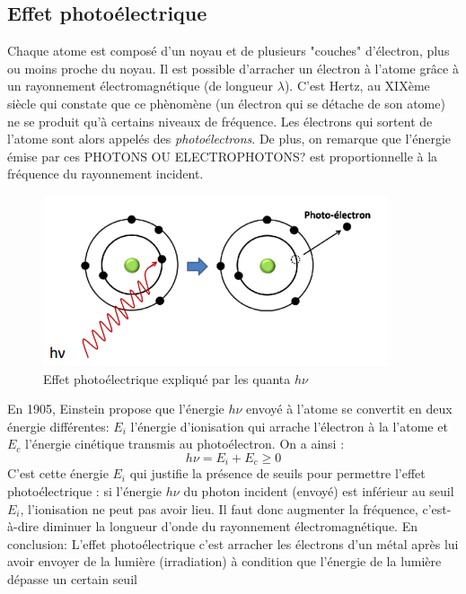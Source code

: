 \documentclass{article}
\begin{document}
\subsection{Effet photoélectrique}
\indent Chaque atome est composé d'un noyau et de plusieurs "couches" d'électron, plus ou moins proche du noyau. Il est possible d'arracher un électron à l'atome grâce à un rayonnement électromagnétique (de longueur $\lambda$).\newline
\indent C'est Hertz, au XIXème siècle qui constate que ce phènomène (un électron qui se détache de son atome) ne se produit qu'à certains niveaux de fréquence. Les électrons qui sortent de l'atome sont alors appelés des \textit{photoélectrons}. De plus, on remarque que l'énergie émise par ces PHOTONS OU ELECTROPHOTONS? est proportionnelle à la fréquence du rayonnement incident.\newline
\begin{figure}[h]
    \centering
    \includegraphics[scale=0.5]{photoelectrique.png}
    \caption{Effet photoélectrique expliqué par les quanta $h\nu$}
\end{figure}
\newline
En 1905, Einstein propose que l'énergie $h\nu$ envoyé à l'atome se convertit en deux énergie différentes: $E_{i}$ l'énergie d'ionisation qui arrache l'électron à la l'atome et $E_{c}$ l'énergie cinétique transmis au photoélectron. On a ainsi : \[ h\nu = E_{i}+E_{c} \geqslant 0 \]
C'est cette énergie $E_{i}$ qui justifie la présence de seuils pour permettre l'effet photoélectrique : si l'énergie $h\nu$ du photon incident (envoyé) est inférieur au seuil $E_{i}$, l'ionisation ne peut pas avoir lieu. Il faut donc augmenter la fréquence, c'est-à-dire diminuer la longueur d'onde du rayonnement électromagnétique.\newline
En conclusion: L'effet photoélectrique c'est arracher les électrons d'un métal après lui avoir envoyer de la lumière (irradiation) à condition que l'énergie de la lumière dépasse un certain seuil
\newpage
\end{document}
